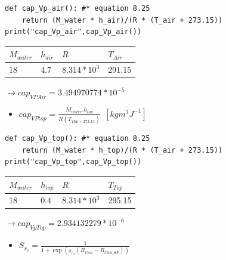 \documentclass[a4paper]{article}
\numberwithin{equation}{section}
\begin{document}
\begin{mdframed}[leftline=false,rightline=false,backgroundcolor=cyan!10]
  \begin{verbatim}
def cap_Vp_air(): #* equation 8.25
    return (M_water * h_air)/(R * (T_air + 273.15))
print("cap_Vp_air",cap_Vp_air())
\end{verbatim}
\end{mdframed}
\begin{table}[H]
\centering
\begin{tabular}{|l|l|l|l|}
\hline
\rowcolor[HTML]{FFFC9E} 
\textbf{$M_{water}$} & \textbf{$h_{air}$} & \cellcolor[HTML]{FFFC9E}\textbf{$R$} & \cellcolor[HTML]{FFFC9E}\textbf{$T_{Air}$}\\ \hline
18            &     4.7           &   $8.314*10^3$          &       291.15                \\ \hline
\end{tabular}
\end{table}
$\rightarrow cap_{VPAir} = 3.494970774*10^{-5}$
\begin{itemize}
    \item $cap_{VPtop} = \frac{M_{water}.h_{top}}{R(T_{Top+273.15})}      ~~[kgm^3J^{-1}] $
\end{itemize}

\begin{mdframed}[leftline=false,rightline=false,backgroundcolor=cyan!10]
  \begin{verbatim}
def cap_Vp_top(): #* equation 8.25
    return (M_water * h_top)/(R * (T_air + 273.15))
print("cap_Vp_top",cap_Vp_top())
\end{verbatim}
\end{mdframed}
\begin{table}[H]
\centering
\begin{tabular}{|l|l|l|l|}
\hline
\rowcolor[HTML]{FFFC9E} 
\textbf{$M_{water}$} & \textbf{$h_{top}$} & \cellcolor[HTML]{FFFC9E}\textbf{$R$} & \cellcolor[HTML]{FFFC9E}\textbf{$T_{Top}$}\\ \hline
18            &     0.4           &   $8.314*10^3$          &       295.15                \\ \hline
\end{tabular}
\end{table}
$\rightarrow cap_{VpTop} = 2.934132279*10^{-6}$
\begin{itemize}
    \item $ S_{r_s} = \frac{1}{1 + \exp \left(s_{r_s} (R_{Can} - R_{Can\_SP})\right)}$
\end{itemize}
\end{document}
